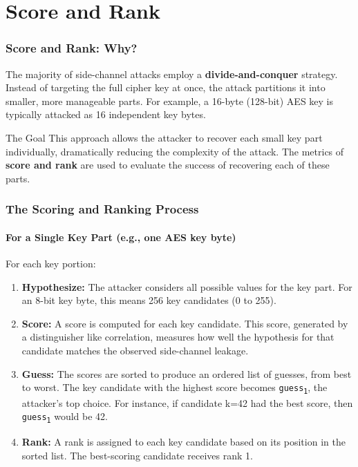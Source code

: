\section{Score and Rank}

\begin{frame}
    \frametitle{Score and Rank: Why?}
    The majority of side-channel attacks employ a \textbf{divide-and-conquer} strategy. \newline
       Instead of targeting the full cipher key at once, the attack partitions it into smaller, more manageable parts. For example, a 16-byte (128-bit) AES key is typically attacked as 16 independent key bytes.
    \vspace{1cm}
    \begin{block}{The Goal}
        This approach allows the attacker to recover each small key part individually, dramatically reducing the complexity of the attack. The metrics of \textbf{score and rank} are used to evaluate the success of recovering each of these parts.
    \end{block}
\end{frame}



\begin{frame}
    \frametitle{The Scoring and Ranking Process}
    \framesubtitle{For a Single Key Part (e.g., one AES key byte)}
    For each key portion:
    \begin{enumerate}
        \item \textbf{Hypothesize:} The attacker considers all possible values for the key part. For an 8-bit key byte, this means 256 key candidates (0 to 255).
        \item \textbf{Score:} A score is computed for each key candidate. This score, generated by a distinguisher like correlation, measures how well the hypothesis for that candidate matches the observed side-channel leakage.
        \item \textbf{Guess:} The scores are sorted to produce an ordered list of guesses, from best to worst. The key candidate with the highest score becomes \texttt{guess\textsubscript{1}}, the attacker's top choice. For instance, if candidate k=42 had the best score, then \texttt{guess\textsubscript{1}} would be 42.
        \item \textbf{Rank:} A rank is assigned to each key candidate based on its position in the sorted list. The best-scoring candidate receives rank 1.
    \end{enumerate}
\end{frame}


